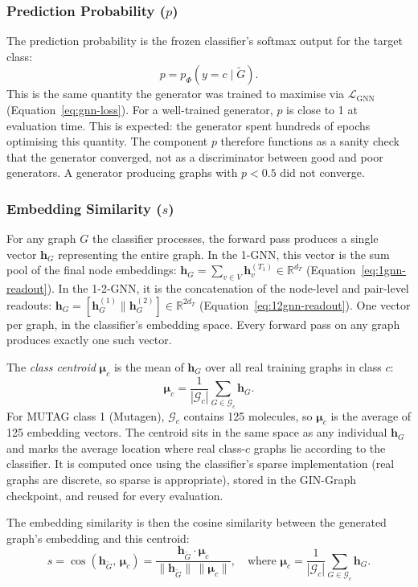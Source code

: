 \documentclass[12pt,a4paper]{article}
\begin{document}
\subsubsection{Prediction Probability ($p$)}

The prediction probability is the frozen classifier's softmax output for the target class:
\[
  p = p_\Phi(y = c \mid \tilde{G}).
\]
This is the same quantity the generator was trained to maximise via $\mathcal{L}_{\text{GNN}}$ (Equation~\ref{eq:gnn-loss}). For a well-trained generator, $p$ is close to 1 at evaluation time. This is expected: the generator spent hundreds of epochs optimising this quantity. The component $p$ therefore functions as a sanity check that the generator converged, not as a discriminator between good and poor generators. A generator producing graphs with $p < 0.5$ did not converge.

\subsubsection{Embedding Similarity ($s$)}

For any graph $G$ the classifier processes, the forward pass produces a single vector $\mathbf{h}_G$ representing the entire graph. In the 1-GNN, this vector is the sum pool of the final node embeddings: $\mathbf{h}_G = \sum_{v \in V} \mathbf{h}_v^{(T_1)} \in \mathbb{R}^{d_T}$ (Equation~\ref{eq:1gnn-readout}). In the 1-2-GNN, it is the concatenation of the node-level and pair-level readouts: $\mathbf{h}_G = [\mathbf{h}_G^{(1)} \| \mathbf{h}_G^{(2)}] \in \mathbb{R}^{2d_T}$ (Equation~\ref{eq:12gnn-readout}). One vector per graph, in the classifier's embedding space. Every forward pass on any graph produces exactly one such vector.

The \emph{class centroid} $\boldsymbol{\mu}_c$ is the mean of $\mathbf{h}_G$ over all real training graphs in class $c$:
\[
  \boldsymbol{\mu}_c = \frac{1}{|\mathcal{G}_c|} \sum_{G \in \mathcal{G}_c} \mathbf{h}_G.
\]
For MUTAG class 1 (Mutagen), $\mathcal{G}_c$ contains 125 molecules, so $\boldsymbol{\mu}_c$ is the average of 125 embedding vectors. The centroid sits in the same space as any individual $\mathbf{h}_G$ and marks the average location where real class-$c$ graphs lie according to the classifier. It is computed once using the classifier's sparse implementation (real graphs are discrete, so sparse is appropriate), stored in the GIN-Graph checkpoint, and reused for every evaluation.

The embedding similarity is then the cosine similarity between the generated graph's embedding and this centroid:
\begin{equation}
  s = \cos(\mathbf{h}_{\tilde{G}},\, \boldsymbol{\mu}_c) = \frac{\mathbf{h}_{\tilde{G}} \cdot \boldsymbol{\mu}_c}{\|\mathbf{h}_{\tilde{G}}\| \, \|\boldsymbol{\mu}_c\|}, \quad \text{where } \boldsymbol{\mu}_c = \frac{1}{|\mathcal{G}_c|} \sum_{G \in \mathcal{G}_c} \mathbf{h}_G.
  \label{eq:emb-sim}
\end{equation}
\end{document}
